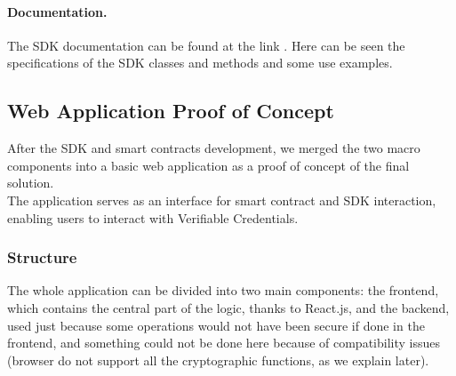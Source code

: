 \paragraph{Documentation.}
The SDK documentation can be found at the link
\href{https://matteocasonato.gitbook.io/ssikit-sdk/}
{}. Here can be seen the 
specifications of the SDK classes and methods and some use examples.

\subsection{Web Application Proof of Concept}
After the SDK and smart contracts development, we merged the two macro components 
into a basic web application as a proof of concept of the final solution.\\
The application serves as an interface for smart contract and SDK interaction, 
enabling users to interact with Verifiable Credentials.

\subsubsection{Structure}
The whole application can be divided into two main components: the frontend, which
contains the central part of the logic, thanks to React.js, and the backend, used 
just because some operations would not have been secure if done in the frontend, and 
something could not be done here because of compatibility issues (browser do not 
support all the cryptographic functions, as we explain later).

